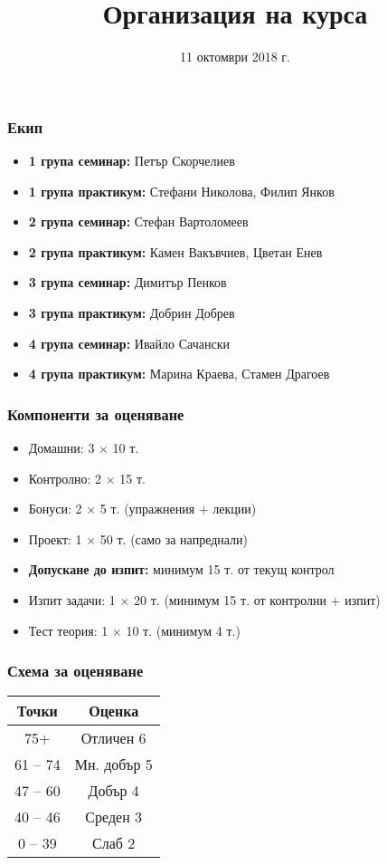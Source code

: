 \documentclass{beamer}
\title{Организация на курса}
\date{11 октомври 2018 г.}
\begin{document}
\begin{frame}
  \titlepage
\end{frame}

\begin{frame}
  \frametitle{Екип}

  \begin{itemize}
  \item \textbf{1 група семинар:} Петър Скорчелиев
  \item \textbf{1 група практикум:} Стефани Николова, Филип Янков
  \item \textbf{2 група семинар:} Стефан Вартоломеев
  \item \textbf{2 група практикум:} Камен Вакъвчиев, Цветан Енев
  \item \textbf{3 група семинар:} Димитър Пенков
  \item \textbf{3 група практикум:} Добрин Добрев
  \item \textbf{4 група семинар:} Ивайло Сачански
  \item \textbf{4 група практикум:} Марина Краева, Стамен Драгоев
  \end{itemize}
\end{frame}

\begin{frame}
  \frametitle{Компоненти за оценяване}

  \begin{itemize}
  \item Домашни: 3 $\times$ 10 т.
  \item Контролно: 2 $\times$ 15 т.
  \item Бонуси: 2 $\times$ 5 т. (упражнения + лекции)
  \item Проект: 1 $\times$ 50 т. (само за напреднали)
  \item \textbf{Допускане до изпит:} минимум 15 т. от текущ контрол
  \item Изпит задачи: 1 $\times$ 20 т. \alert{(минимум 15 т. от контролни + изпит)}
  \item Тест теория: 1 $\times$ 10 т. \alert{(минимум 4 т.)}
  \end{itemize}
\end{frame}

\begin{frame}
  \frametitle{Схема за оценяване}

  \begin{center}
    \begin{tabular}{|c|c|}
      \hline
      \textbf{Точки} & \textbf{Оценка}\\
      \hline\hline
      75+&Отличен 6\\
      \hline
      61 -- 74&Мн. добър 5\\
      \hline
      47 -- 60&Добър 4\\
      \hline
      40  -- 46&Среден 3\\
      \hline
      0  --  39&Слаб 2\\
      \hline
    \end{tabular}
  \end{center}
\end{frame}
\end{document}
